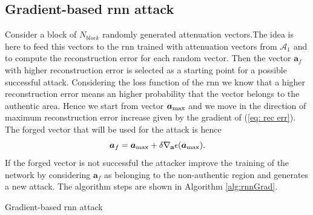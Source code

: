 \documentclass[draftcls,onecolumn,12pt]{IEEEtran}
\begin{document}
\subsection{Gradient-based \ac{rnn} attack}
Consider a block of $N_{block}$ randomly generated attenuation vectors.The idea is here to feed this vectors to the \ac{rnn} trained with attenuation vectors from $\mathcal{A}_1$ and to compute the reconstruction error for each random vector. Then the vector $\bm{a}_f$ with higher reconstruction error is selected as a starting point for a possible successful attack. Considering the loss function of the \ac{rnn} we know that a higher reconstruction error means an higher probability that the vector belongs to the authentic area. Hence we start from vector $\bm{a}_{\rm max}$ and we move in the direction of maximum reconstruction error increase given by the gradient of (\ref{eq: rec err}).
The forged vector that will be used for the attack is hence
\begin{equation}\label{eq: rnn attack}
    \bm{a}_f = \bm{a}_{\rm max}+ \delta \nabla_{\mathbf{a}}\epsilon(\bm{a}_{\rm max}).
\end{equation}
If the forged vector is not successful the attacker improve the training of the network by considering $\bm{a}_f$ as belonging to the non-authentic region and generates a new attack. The algorithm steps are shown in Algorithm \ref{alg:rnnGrad}.

\begin{algorithm}[t]
\label{alg:rnnGrad}
  \scriptsize

 

    
 \caption{Gradient-based \ac{rnn} attack}
\end{algorithm}
\end{document}
